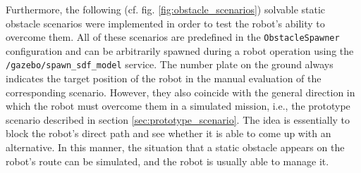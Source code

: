 \documentclass[english, master, utf8]{base/thesis_KBS}
\newcommand{\code}[1]{\colorbox{light-gray}{\texttt{#1}}}
\begin{document}
Furthermore, the following (cf. fig. \ref{fig:obstacle_scenarios}) solvable static obstacle scenarios were implemented in order to test the robot's ability to overcome them. All of
these scenarios are predefined in the \code{ObstacleSpawner} configuration and can be arbitrarily spawned during a robot operation using the \code{/gazebo/spawn\_sdf\_model} service.
The number plate on the ground always indicates
the target position of the robot in the manual evaluation of the corresponding scenario. However, they also coincide with the general direction in which the robot must overcome them in
a simulated mission, i.e., the prototype scenario described in section \ref{sec:prototype_scenario}. The idea is essentially to block the robot's direct path and see whether it is
able to come up with an alternative. In this manner, the situation that a static obstacle appears on the robot's route can be simulated, and the robot is usually able to manage it.
\end{document}
